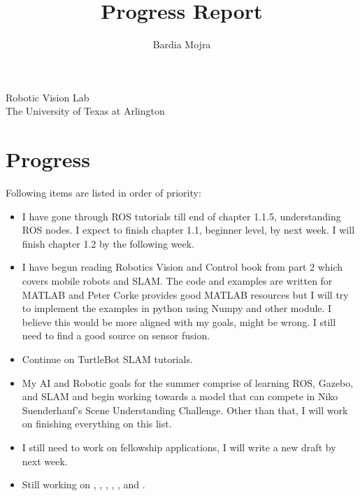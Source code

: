 \documentclass[11pt]{article}
\title{Progress Report}
\author{Bardia Mojra}
\begin{document}
	\maketitle
	\thispagestyle{empty}

\begin{center}
\bigskip
\bigskip
 Robotic Vision Lab\\
 The University of Texas at Arlington\\
\end{center}

\newpage 

\section{Progress}
Following items are listed in order of priority: 
\begin{itemize}  
	
  \item I have gone through ROS tutorials till end of chapter 1.1.5, understanding ROS nodes. I expect to finish chapter 1.1, beginner level, by next week. I will finish chapter 1.2 by the following week. 
  
  \item I have begun reading Robotics Vision and Control book from part 2 which covers mobile robots and SLAM. The code and examples are written for MATLAB and Peter Corke provides good MATLAB resources but I will try to implement the examples in python using Numpy and other module. I believe this would be more aligned with my goals, might be wrong. I still need to find a good source on sensor fusion. 
  
  \item Continue on TurtleBot SLAM tutorials. 
  
  \item My AI and Robotic goals for the summer comprise of learning ROS, Gazebo, and SLAM and begin working towards a model that can compete in Niko Suenderhauf's Scene Understanding Challenge. Other than that, I will work on finishing everything on this list. 
    
  \item I still need to work on fellowship applications, I will write a new draft by next week. 
    
  \item Still working on \cite{PanopticSeg2019}, \cite{SVO}, \cite{HornsMethod}, \cite{NYUV2}, \cite{DGCNNLPC}, and \cite{MaskRCNN}.

\end{itemize}
\end{document}
